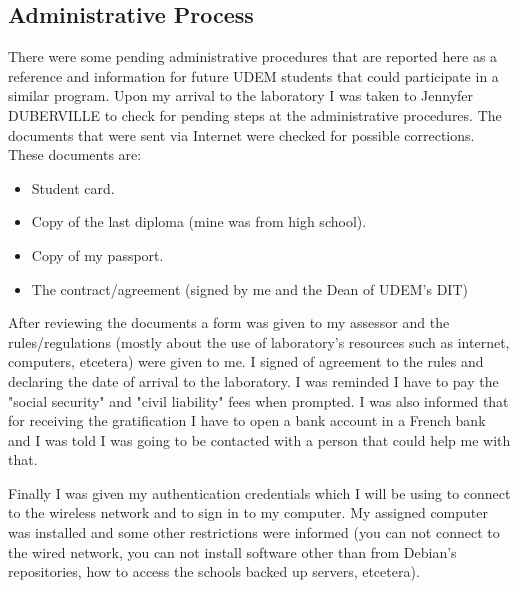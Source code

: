 \subsection{Administrative Process}

There were some pending administrative procedures that are reported here as a reference and information for future UDEM students that could participate in a similar program. Upon my arrival to the laboratory I was taken to Jennyfer DUBERVILLE to check for pending steps at the administrative procedures. The documents that were sent via Internet were checked for possible corrections. These documents are:
\begin{itemize}
	\item Student card.
	\item Copy of the last diploma (mine was from high school).
	\item Copy of my passport.
	\item The contract/agreement (signed by me and the Dean of UDEM's DIT)
\end{itemize}
After reviewing the documents a form was given to my assessor and the rules/regulations (mostly about the use of laboratory's resources such as internet, computers, etcetera) were given to me. I signed of agreement to the rules and declaring the date of arrival to the laboratory. I was reminded I have to pay the "social security" and "civil liability" fees when prompted. I was also informed that for receiving the gratification I have to open a bank account in a French bank and I was told I was going to be contacted with a person that could help me with that.

Finally I was given my authentication credentials which I will be using to connect to the wireless network and to sign in to my computer. My assigned computer was installed and some other restrictions were informed (you can not connect to the wired network, you can not install software other than from Debian's repositories, how to access the schools backed up servers, etcetera).
